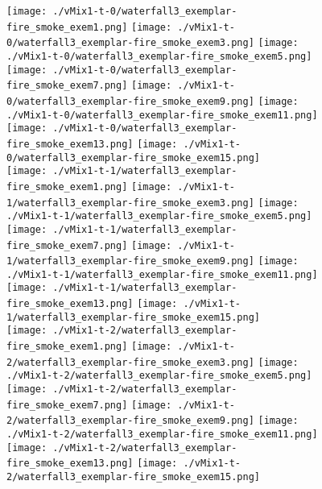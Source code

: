 \begin{figure}[ht!]
{\centering
    \texttt{[image: ./vMix1-t-0/waterfall3\_exemplar-fire\_smoke\_exem1.png]}
    \texttt{[image: ./vMix1-t-0/waterfall3\_exemplar-fire\_smoke\_exem3.png]}
    \texttt{[image: ./vMix1-t-0/waterfall3\_exemplar-fire\_smoke\_exem5.png]}
    \texttt{[image: ./vMix1-t-0/waterfall3\_exemplar-fire\_smoke\_exem7.png]}
    \texttt{[image: ./vMix1-t-0/waterfall3\_exemplar-fire\_smoke\_exem9.png]}
    \texttt{[image: ./vMix1-t-0/waterfall3\_exemplar-fire\_smoke\_exem11.png]}
    \texttt{[image: ./vMix1-t-0/waterfall3\_exemplar-fire\_smoke\_exem13.png]}
    \texttt{[image: ./vMix1-t-0/waterfall3\_exemplar-fire\_smoke\_exem15.png]} \\
\vspace{1mm}
    \texttt{[image: ./vMix1-t-1/waterfall3\_exemplar-fire\_smoke\_exem1.png]}
    \texttt{[image: ./vMix1-t-1/waterfall3\_exemplar-fire\_smoke\_exem3.png]}
    \texttt{[image: ./vMix1-t-1/waterfall3\_exemplar-fire\_smoke\_exem5.png]}
    \texttt{[image: ./vMix1-t-1/waterfall3\_exemplar-fire\_smoke\_exem7.png]}
    \texttt{[image: ./vMix1-t-1/waterfall3\_exemplar-fire\_smoke\_exem9.png]}
    \texttt{[image: ./vMix1-t-1/waterfall3\_exemplar-fire\_smoke\_exem11.png]}
    \texttt{[image: ./vMix1-t-1/waterfall3\_exemplar-fire\_smoke\_exem13.png]}
    \texttt{[image: ./vMix1-t-1/waterfall3\_exemplar-fire\_smoke\_exem15.png]} \\
\vspace{1mm}
    \texttt{[image: ./vMix1-t-2/waterfall3\_exemplar-fire\_smoke\_exem1.png]}
    \texttt{[image: ./vMix1-t-2/waterfall3\_exemplar-fire\_smoke\_exem3.png]}
    \texttt{[image: ./vMix1-t-2/waterfall3\_exemplar-fire\_smoke\_exem5.png]}
    \texttt{[image: ./vMix1-t-2/waterfall3\_exemplar-fire\_smoke\_exem7.png]}
    \texttt{[image: ./vMix1-t-2/waterfall3\_exemplar-fire\_smoke\_exem9.png]}
    \texttt{[image: ./vMix1-t-2/waterfall3\_exemplar-fire\_smoke\_exem11.png]}
    \texttt{[image: ./vMix1-t-2/waterfall3\_exemplar-fire\_smoke\_exem13.png]}
    \texttt{[image: ./vMix1-t-2/waterfall3\_exemplar-fire\_smoke\_exem15.png]} \\
}
\end{figure}
